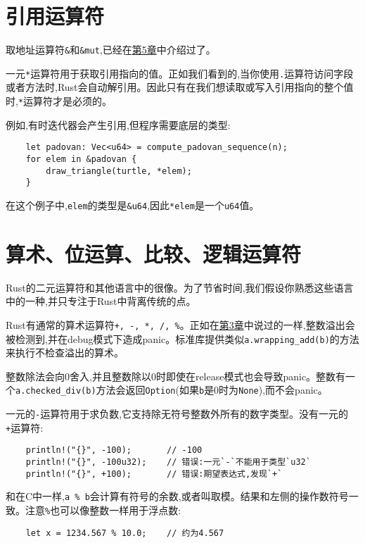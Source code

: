 \section{引用运算符}

取地址运算符\texttt{\&}和\texttt{\&mut},已经在\hyperref[ch05]{第5章}中介绍过了。

一元\texttt{*}运算符用于获取引用指向的值。正如我们看到的,当你使用\texttt{.}运算符访问字段或者方法时,Rust会自动解引用。因此只有在我们想读取或写入引用指向的整个值时,\texttt{*}运算符才是必须的。

例如,有时迭代器会产生引用,但程序需要底层的类型:
\begin{verbatim}
    let padovan: Vec<u64> = compute_padovan_sequence(n);
    for elem in &padovan {
        draw_triangle(turtle, *elem);
    }
\end{verbatim}

在这个例子中,\texttt{elem}的类型是\texttt{\&u64},因此\texttt{*elem}是一个\texttt{u64}值。

\section{算术、位运算、比较、逻辑运算符}

Rust的二元运算符和其他语言中的很像。为了节省时间,我们假设你熟悉这些语言中的一种,并只专注于Rust中背离传统的点。

Rust有通常的算术运算符\texttt{+, -, *, /, \%}。正如在\hyperref[ch03]{第3章}中说过的一样,整数溢出会被检测到,并在debug模式下造成panic。标准库提供类似\texttt{a.wrapping\_add(b)}的方法来执行不检查溢出的算术。

整数除法会向0舍入,并且整数除以0时即使在release模式也会导致panic。整数有一个\texttt{a.checked\_div(b)}方法会返回\texttt{Option}(如果\texttt{b}是0时为\texttt{None}),而不会panic。

一元的\texttt{-}运算符用于求负数,它支持除无符号整数外所有的数字类型。没有一元的\texttt{+}运算符:
\begin{verbatim}
    println!("{}", -100);       // -100
    println!("{}", -100u32);    // 错误:一元`-`不能用于类型`u32`
    println!("{}", +100);       // 错误:期望表达式,发现`+`
\end{verbatim}

和在C中一样,\texttt{a \% b}会计算有符号的余数,或者叫取模。结果和左侧的操作数符号一致。注意\texttt{\%}也可以像整数一样用于浮点数:
\begin{verbatim}
    let x = 1234.567 % 10.0;    // 约为4.567
\end{verbatim}

